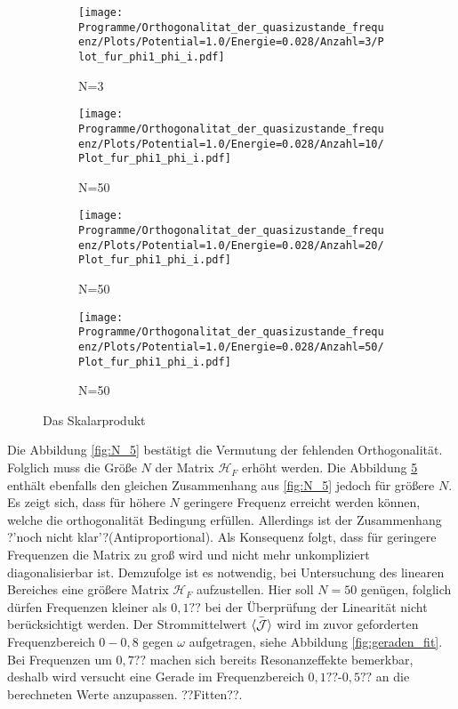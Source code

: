 \begin{figure}
   \centering
   \begin{subfigure}{0.48\textwidth}
       \texttt{[image: Programme/Orthogonalitat\_der\_quasizustande\_frequenz/Plots/Potential=1.0/Energie=0.028/Anzahl=3/Plot\_fur\_phi1\_phi\_i.pdf]}
       \caption{N=3}
       \label{fig:N_3}
     \end{subfigure}
     \begin{subfigure}{0.48\textwidth}
       \texttt{[image: Programme/Orthogonalitat\_der\_quasizustande\_frequenz/Plots/Potential=1.0/Energie=0.028/Anzahl=10/Plot\_fur\_phi1\_phi\_i.pdf]}
       \caption{N=50}
       \label{fig:N_10}
     \end{subfigure}
     \begin{subfigure}{0.48\textwidth}
       \texttt{[image: Programme/Orthogonalitat\_der\_quasizustande\_frequenz/Plots/Potential=1.0/Energie=0.028/Anzahl=20/Plot\_fur\_phi1\_phi\_i.pdf]}
       \caption{N=50}
       \label{fig:N_20}
     \end{subfigure}
     \begin{subfigure}{0.48\textwidth}
       \texttt{[image: Programme/Orthogonalitat\_der\_quasizustande\_frequenz/Plots/Potential=1.0/Energie=0.028/Anzahl=50/Plot\_fur\_phi1\_phi\_i.pdf]}
       \caption{N=50}
       \label{fig:N_50}
     \end{subfigure}
        \caption{Das Skalarprodukt }
    \label{fig:N_gross}
\end{figure}


Die Abbildung \ref{fig:N_5} bestätigt
die Vermutung der fehlenden Orthogonalität.
Folglich muss die Größe $N$ der Matrix
$\mathcal{H}_F$ erhöht werden.
Die Abbildung \ref{fig:N_gross} enthält ebenfalls
den gleichen Zusammenhang
aus \ref{fig:N_5} jedoch für
größere $N$.
Es zeigt sich, dass für höhere $N$ geringere Frequenz
erreicht werden können, welche die orthogonalität Bedingung
erfüllen. Allerdings
ist der Zusammenhang ?'noch nicht klar'?(Antiproportional).
Als Konsequenz folgt, dass für geringere
Frequenzen die Matrix zu groß wird und nicht
mehr unkompliziert diagonalisierbar ist.
Demzufolge ist es notwendig, bei Untersuchung des linearen Bereiches eine
größere Matrix $\mathcal{H}_F$ aufzustellen. Hier soll $N=50$ genügen,
folglich dürfen Frequenzen kleiner als $0,1??$ bei der Überprüfung der Linearität nicht
berücksichtigt werden.
Der Strommittelwert $\bar{\braket{\mathcal{J}}}$
 wird im zuvor geforderten Frequenzbereich $0-0,8$
gegen $\omega$ aufgetragen, siehe Abbildung \ref{fig:geraden_fit}.
Bei Frequenzen um $0,7??$
machen sich bereits Resonanzeffekte bemerkbar,
deshalb wird versucht eine Gerade im Frequenzbereich $0,1??$-$0,5??$
an die berechneten Werte anzupassen. ??Fitten??.

